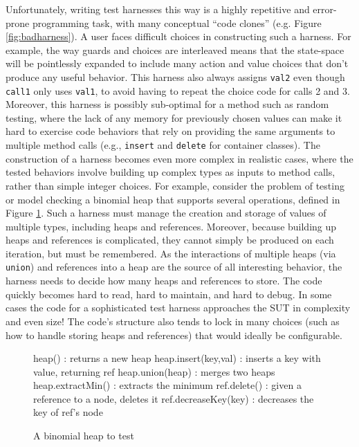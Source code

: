 \documentclass[runningheads,a4paper]{llncs}
\begin{document}
Unfortunately, writing test harnesses this way is a highly repetitive
and error-prone programming task, with many conceptual ``code clones''
(e.g. Figure \ref{fig:badharness}). A user faces difficult choices in
constructing such a harness. For example, the way guards and choices
are interleaved means that the state-space will be pointlessly
expanded to include many action and value choices that don't produce
any useful behavior.  This harness also always assigns {\tt val2} even
though {\tt call1} only uses {\tt val1}, to avoid having to repeat the
choice code for calls 2 and 3.  Moreover, this harness is possibly
sub-optimal for a method such as random testing, where the lack of any
memory for previously chosen values can make it hard to exercise code
behaviors that rely on providing the same arguments to multiple method
calls (e.g., {\tt insert} and {\tt delete} for container classes).
The construction of a harness becomes even more complex in realistic
cases, where the tested behaviors involve building up complex types as
inputs to method calls, rather than simple integer choices. For
example, consider the problem of testing or model checking a binomial
heap that supports several operations, defined in Figure
\ref{fig:binheap}.  Such a harness must manage the creation and
storage of values of multiple types, including heaps and references.
Moreover, because building up heaps and references is complicated,
they cannot simply be produced on each iteration, but must be
remembered.  As the interactions of multiple heaps (via {\tt union})
and references into a heap are the source of all interesting behavior,
the harness needs to decide how many heaps and references to store.
The code quickly becomes hard to read, hard to maintain, and hard to
debug.  In some cases \cite{AMAI} the code for a sophisticated test
harness approaches the SUT in complexity and even size!  The code's
structure also tends to lock in many choices (such as how to handle
storing heaps and references) that would ideally be configurable.

\begin{figure}[t]
{\scriptsize
\begin{code}
heap()                : returns a new heap
heap.insert(key,val)  : inserts a key with value, returning ref
heap.union(heap)      : merges two heaps
heap.extractMin()     : extracts the minimum
ref.delete()          : given a reference to a node, deletes it
ref.decreaseKey(key)  : decreases the key of ref's node
\end{code}
}
\vspace{-0.1in}
\caption{A binomial heap to test}
\label{fig:binheap}
\vspace{-0.20in}
\end{figure}
\end{document}
